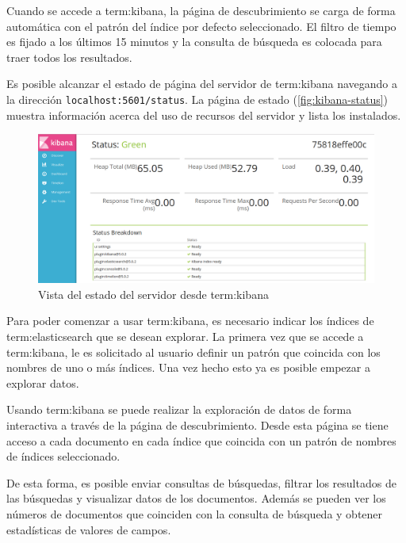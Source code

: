 Cuando se accede a \gls{term:kibana}, la página de descubrimiento se carga de
forma automática con el patrón del índice por defecto seleccionado. El filtro
de tiempo es fijado a los últimos 15 minutos y la consulta de búsqueda es
colocada para traer todos los resultados.

Es posible alcanzar el estado de página del servidor de \gls{term:kibana}
navegando a la dirección \lstinline{localhost:5601/status}. La página de estado
(\autoref{fig:kibana-status}) muestra información acerca del uso de recursos
del servidor y lista los  instalados.

\begin{figure}
  \includegraphics[width=\linewidth]{src/images/05-capitulo-5/kibanastatus.jpg}
  \caption{Vista del estado del servidor desde \gls{term:kibana}}
  \label{fig:kibana-status}
\end{figure}

Para poder comenzar a usar \gls{term:kibana}, es necesario indicar los índices
de \gls{term:elasticsearch} que se desean explorar. La primera vez que se accede
a \gls{term:kibana}, le es solicitado al usuario definir un patrón que coincida
con los nombres de uno o más índices. Una vez hecho esto ya es posible empezar a
explorar datos.

Usando \gls{term:kibana} se puede realizar la exploración de datos de forma
interactiva a través de la página de descubrimiento. Desde esta página se tiene
acceso a cada documento en cada índice que coincida con un patrón de nombres de
índices seleccionado.

De esta forma, es posible enviar consultas de búsquedas, filtrar los resultados
de las búsquedas y visualizar datos de los documentos. Además se pueden ver los
números de documentos que coinciden con la consulta de búsqueda y obtener
estadísticas de valores de campos.

